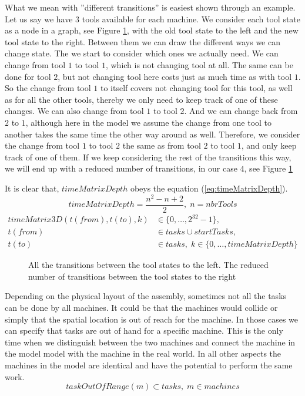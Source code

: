  What we mean with ''different transitions'' is easiest shown through an example. Let us say we have $3$ tools available for each machine. We consider each tool state as a node in a graph, see Figure \ref{fig:tools_trans}, with the old tool state to the left and the new tool state to the right. Between them we can draw the different ways we can change state. The we start to consider which ones we actually need. We can change from tool $1$ to tool $1$, which is not changing tool at all. The same can be done for tool $2$, but not changing tool here costs just as much time as with tool $1$. So the change from tool $1$ to itself covers not changing tool for this tool, as well as for all the other tools, thereby we only need to keep track of one of these changes. We can also change from tool $1$ to tool $2$. And we can change back from $2$ to $1$, although here in the model we assume the change from one tool to another takes the same time the other way around as well. Therefore, we consider the change from tool $1$ to tool $2$ the same as from tool $2$ to tool $1$, and only keep track of one of them. If we keep considering the rest of the transitions this way, we will end up with a reduced number of transitions, in our case $4$, see Figure \ref{fig:tools_trans}
 
 It is clear that, $timeMatrixDepth$ obeys the equation (\ref{eq:timeMatrixDepth}). 
 \begin{equation}\label{eq:timeMatrixDepth}
 timeMatrixDepth = \frac{n^2 - n + 2}{2}, \; n = nbrTools
 \end{equation}
  \begin{equation}
  \begin{aligned}\label{eq:44}
  timeMatrix3D(t(from),t(to),k) &\in \{0 , \ldots , 2^{32}-1\},\\
  t(from) &\in tasks \cup startTasks,  \\ 
  t(to) &\in tasks, \; k \in \{0 , \ldots , timeMatrixDepth\}
  \end{aligned}
  \end{equation}

 
 \begin{figure}
 	\centering
 	
  	
  	\caption{All the transitions between the tool states to the left. The reduced number of transitions between the tool states to the right}
  	\label{fig:tools_trans}
 \end{figure}

\noindent Depending on the physical layout of the assembly, sometimes not all the tasks can be done by all machines. It could be that the machines would collide or simply that the spatial location is out of reach for the machine. In those cases we can specify that tasks are out of hand for a specific machine. This is the only time when we distinguish between the two machines and connect the machine in the model model with the machine in the real world. In all other aspects the machines in the model are identical and have the potential to perform the same work.
 \begin{equation}\label{eq:56}
 taskOutOfRange(m) \subset tasks, \; m \in machines
 \end{equation}
 
